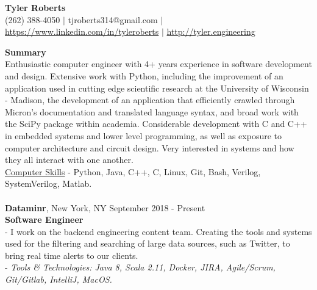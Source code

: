 \documentclass{resume}
\begin{document}
\begin{center}
{\LARGE \bf Tyler Roberts} \\[1mm]
\footnotesize
(262) 388-4050 $|$
tjroberts314@gmail.com $|$
\href{https://www.linkedin.com/in/tyleroberts}{https://www.linkedin.com/in/tyleroberts} $|$
\href{http://tyler.engineering}{http://tyler.engineering}
\end{center}
\begin{flushleft}

{\textbf{\large Summary}} \\
{
\footnotesize
\tab Enthusiastic computer engineer with 4+ years experience in software development and design. Extensive work with Python, including the improvement of an application used in cutting edge scientific research at the University of Wisconsin - Madison, the development of an application that efficiently crawled through Micron's documentation and translated language syntax, and broad work with the SciPy package within academia. Considerable development with C and C++ in embedded systems and lower level programming, as well as exposure to computer architecture and circuit design. Very interested in systems and how they all interact with one another. \\[2mm]
}
\underline{Computer Skills} - Python, Java, C++, C, Linux, Git, Bash, Verilog, SystemVerilog, Matlab. \\[5mm]
\\[2mm]

\textbf{Dataminr}, New York, NY \hfill September 2018 - Present\\
\textbf{Software Engineer}\\
{\footnotesize
\ttab- I work on the backend engineering content team. Creating the tools and systems used for the filtering and searching of large \ttab data sources, such as Twitter, to bring real time alerts to our clients. \\
\ttab- \textit{Tools \& Technologies: Java 8, Scala 2.11, Docker, JIRA, Agile/Scrum, Git/Gitlab, IntelliJ, MacOS.}\\[3mm]
}


\end{flushleft}
\end{document}
